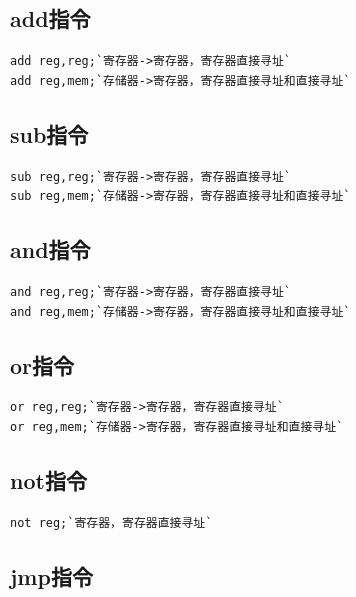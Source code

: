 \documentclass[UTF8]{ctexrep}
\begin{document}
\subsection{add指令}

\begin{lstlisting}[language={[x86masm]Assembler}]
add reg,reg;`寄存器->寄存器，寄存器直接寻址`
add reg,mem;`存储器->寄存器，寄存器直接寻址和直接寻址`
\end{lstlisting}

\subsection{sub指令}

\begin{lstlisting}[language={[x86masm]Assembler}]
sub reg,reg;`寄存器->寄存器，寄存器直接寻址`
sub reg,mem;`存储器->寄存器，寄存器直接寻址和直接寻址`
\end{lstlisting}

\subsection{and指令}

\begin{lstlisting}[language={[x86masm]Assembler}]
and reg,reg;`寄存器->寄存器，寄存器直接寻址`
and reg,mem;`存储器->寄存器，寄存器直接寻址和直接寻址`
\end{lstlisting}

\subsection{or指令}

\begin{lstlisting}[language={[x86masm]Assembler}]
or reg,reg;`寄存器->寄存器，寄存器直接寻址`
or reg,mem;`存储器->寄存器，寄存器直接寻址和直接寻址`
\end{lstlisting}

\subsection{not指令}

\begin{lstlisting}[language={[x86masm]Assembler}]
not reg;`寄存器，寄存器直接寻址`
\end{lstlisting}

\subsection{jmp指令}
\end{document}
